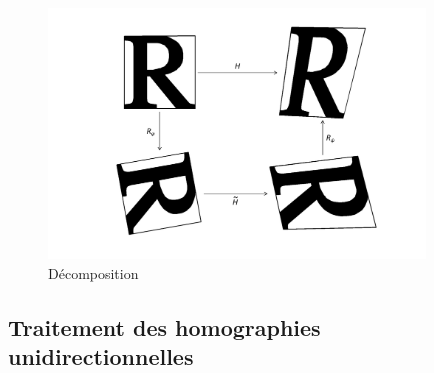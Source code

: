 \documentclass[c,12pt]{beamer}
\begin{document}
  \begin{frame}
  \begin{figure}
   \centering
   \includegraphics[width=100mm]{beamer_decompo_bilan.png}
   \caption{Décomposition}
  \end{figure}
  \end{frame}




 \subsection{Traitement des homographies unidirectionnelles}
\end{document}
